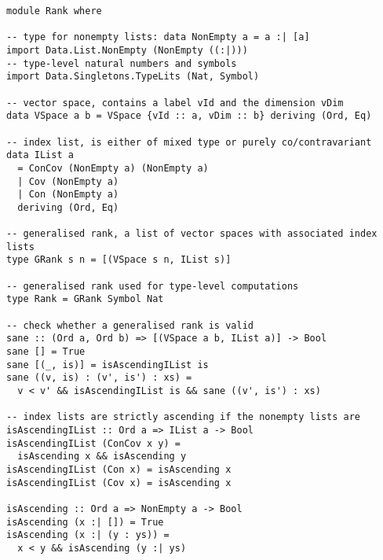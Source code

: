\begin{code}
  \label{code_haskell_rank_type}
  \begin{verbatim}
module Rank where

-- type for nonempty lists: data NonEmpty a = a :| [a]
import Data.List.NonEmpty (NonEmpty ((:|)))
-- type-level natural numbers and symbols
import Data.Singletons.TypeLits (Nat, Symbol)

-- vector space, contains a label vId and the dimension vDim
data VSpace a b = VSpace {vId :: a, vDim :: b} deriving (Ord, Eq)

-- index list, is either of mixed type or purely co/contravariant
data IList a
  = ConCov (NonEmpty a) (NonEmpty a)
  | Cov (NonEmpty a)
  | Con (NonEmpty a)
  deriving (Ord, Eq)

-- generalised rank, a list of vector spaces with associated index lists
type GRank s n = [(VSpace s n, IList s)]

-- generalised rank used for type-level computations
type Rank = GRank Symbol Nat

-- check whether a generalised rank is valid
sane :: (Ord a, Ord b) => [(VSpace a b, IList a)] -> Bool
sane [] = True
sane [(_, is)] = isAscendingIList is
sane ((v, is) : (v', is') : xs) =
  v < v' && isAscendingIList is && sane ((v', is') : xs)

-- index lists are strictly ascending if the nonempty lists are
isAscendingIList :: Ord a => IList a -> Bool
isAscendingIList (ConCov x y) =
  isAscending x && isAscending y
isAscendingIList (Con x) = isAscending x
isAscendingIList (Cov x) = isAscending x

isAscending :: Ord a => NonEmpty a -> Bool
isAscending (x :| []) = True
isAscending (x :| (y : ys)) =
  x < y && isAscending (y :| ys)
  \end{verbatim}
\end{code}

